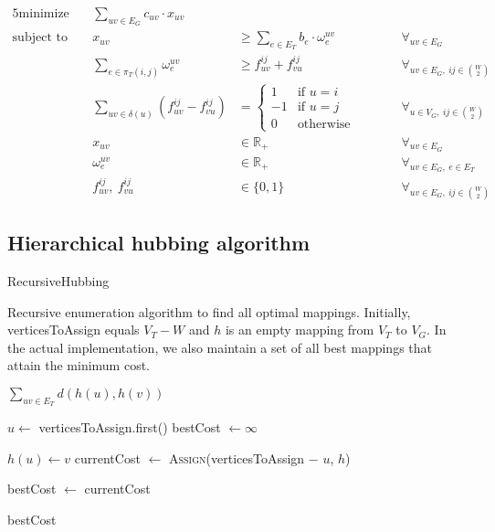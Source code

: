 \begin{alignat*}{5}
    \text{minimize}\ && \sum_{uv \in E_G} c_{uv} \cdot x_{uv} &&& \\
    \text{subject to}\ && x_{uv} &\ge \sum_{e \in E_T} b_e \cdot \omega_e^{uv} &&\qquad \forall_{uv \in E_G} \\
    && \sum_{e \in \pi_T(i,j)} \omega_e^{uv} &\ge f_{uv}^{ij} + f_{vu}^{ij} &&\qquad \forall_{uv \in E_G,\ ij \in \binom{W}{2}} \\
    && \sum_{uv \in \delta(u)} (f_{uv}^{ij} - f_{vu}^{ij}) &= \begin{cases}
                                                                1 & \text{if $u = i$} \\
                                                                -1 & \text{if $u = j$} \\
                                                                0 & \text{otherwise}
    \end{cases} &&\qquad \forall_{u \in V_G,\ ij \in \binom{W}{2}} \\
    && x_{uv} &\in \mathbb{R}_+ &&\qquad \forall_{uv \in E_G} \\
    && \omega_e^{uv} &\in \mathbb{R}_+ &&\qquad \forall_{uv \in E_G,\ e \in E_T} \\
    && f_{uv}^{ij},\ f_{vu}^{ij} &\in \{ 0, 1 \} &&\qquad \forall_{uv \in E_G,\ ij \in \binom{W}{2}}
\end{alignat*}

\subsection{Hierarchical hubbing algorithm}
\begin{algorithm}[t]
    \caption{RecursiveHubbing}
    \label{alg:bruteForceHubbing}
    \begin{algorithmic}[1]
        \Statex Recursive enumeration algorithm to find all optimal mappings. Initially, verticesToAssign equals $V_T - W$ and $h$ is an empty mapping from $V_T$ to $V_G$. In the actual implementation, we also maintain a set of all best mappings that attain the minimum cost.

                \State \Return $\sum_{uv \in E_T} d(h(u), h(v))$ 
            \EndIf

            \State $u \gets$ verticesToAssign.first()
            \State bestCost $\gets \infty$

                \State $h(u) \gets v$
                \State currentCost $\gets$ \textsc{Assign}(verticesToAssign $-$ $u$, $h$)

                    \State bestCost $\gets$ currentCost
                \EndIf
            \EndFor

            \State \Return bestCost
        \EndProcedure
    \end{algorithmic}
\end{algorithm}

